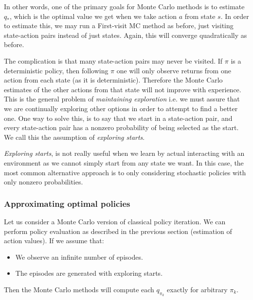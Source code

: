     In other words, one of the primary goals for Monte Carlo methods is to 
    estimate $q_*$, which is the optimal value we get when we take action $a$ 
    from state $s$. In order to estimate this, we may run a First-visit MC 
    method as before, just visiting state-action pairs instead of just states. 
    Again, this will converge quadratically as before.
    
    The complication is that many state-action pairs may never be visited. If 
    $\pi$ is a deterministic policy, then following $\pi$ one will only observe 
    returns from one action from each state (as it is deterministic). Therefore 
    the Monte Carlo estimates of the other actions from that state will not 
    improve with experience. This is the general problem of \textit{maintaining 
    exploration} i.e. we must assure that we are continually exploring other 
    options in order to attempt to find a better one. One way to solve this, is 
    to say that we start in a state-action pair, and every state-action pair 
    has a nonzero probability of being selected as the start. We call this the 
    assumption of \textit{exploring starts}.
    
    \textit{Exploring starts}, is not really useful when we learn by actual 
    interacting with an environment as we cannot simply start from any state we 
    want. In this case, the most common alternative approach is to only 
    considering stochastic policies with only nonzero probabilities.
    
    \subsubsection{Approximating optimal policies}
    Let us consider a Monte Carlo version of classical policy iteration. We can 
    perform policy evaluation as described in the previous section (estimation 
    of action values). If we assume that:
    \begin{itemize}
        \item We observe an infinite number of episodes.
        \item The episodes are generated with exploring starts.
    \end{itemize}
    Then the Monte Carlo methods will compute each $q_{\pi_k}$ exactly for 
    arbitrary $\pi_k$.
    
